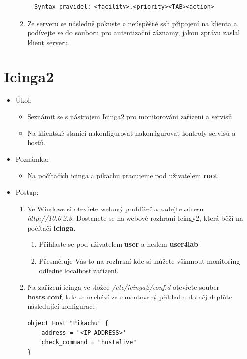\begin{itemize}
\begin{enumerate}
\begin{verbatim} 
  Syntax pravidel: <facility>.<priority><TAB><action>
\end{verbatim} 
         \item Ze serveru se následně pokuste o neúspěšné ssh připojení na klienta a podívejte se
         do souboru pro autentizační záznamy, jakou zprávu zaslal klient serveru.


       \end{enumerate}
   \end{itemize}

\section{Icinga2}
  \begin{itemize}
    \item Úkol: 
    \begin{itemize}
      \item Seznámit se s nástrojem Icinga2 pro monitorováni zařízení a servisů 
      \item Na klientské stanici nakonfigurovat nakonfigurovat kontroly servisů a hostů.  
    \end{itemize}
    \item Poznámka:
        \begin{itemize}
            \item Na počítačích icinga a pikachu pracujeme pod uživatelem \textbf{root}
        \end{itemize}
    \item Postup:
       \begin{enumerate}   
            \item Ve Windows si otevřete webový prohlížeč a zadejte adresu 
            \textit{http://10.0.2.3}. Dostanete se na webové rozhraní Icingy2,
            která běží na počítači \textbf{icinga}.
               \begin{enumerate}
                   \item Přihlaste se pod uživatelem \textbf{user} a heslem \textbf{user4lab}
                    \item Přesměruje Vás to na rozhraní kde si můžete všimnout monitoring odledně localhost zařízení.
               \end{enumerate}
            \item Na zařízení icinga ve složce \textit{/etc/icinga2/conf.d} otevřete soubor \textbf{hosts.conf}, kde se nachází zakomentovaný příklad a do něj doplňte následující konfiguraci:
\begin{verbatim}
object Host "Pikachu" {
    address = "<IP ADDRESS>"
    check_command = "hostalive"
}


\end{verbatim}
\end{enumerate}
\end{itemize}
